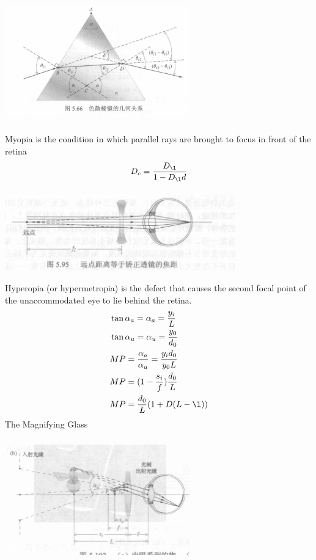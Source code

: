 \documentclass[fleqn,leqno]{article}
\begin{document}
		\includegraphics[width=8cm,height=6cm]{prism.png}\\
		Myopia is the condition in which parallel rays are brought to focus in front of the retina\\
		\begin{equation*}
			D_{c}=\frac{D_{\l}}{1-D_{\l}d}
		\end{equation*}
		\includegraphics[width=10cm,height=4cm]{far point.png}\\
		Hyperopia (or hypermetropia) is the defect that causes the second focal point of the unaccommodated eye to lie behind the retina.\\
		\begin{equation*}
			\begin{split}
				&\tan\alpha_{a}=\alpha_{a}=\frac{y_{i}}{L}\\
				&\tan\alpha_{u}=\alpha_{u}=\frac{y_{0}}{d_{0}}\\
				&MP=\frac{\alpha_{a}}{\alpha_{u}}=\frac{y_{i}d_{0}}{y_{0}L}\\
				&MP=(1-\frac{s_{i}}{f})\frac{d_{0}}{L}\\
				&MP=\frac{d_{0}}{L}(1+D(L-\l))\\
			\end{split}
		\end{equation*}
		The Magnifying Glass\\
		\includegraphics[width=8cm,height=6cm]{enlarge.png}\\
\end{document}
